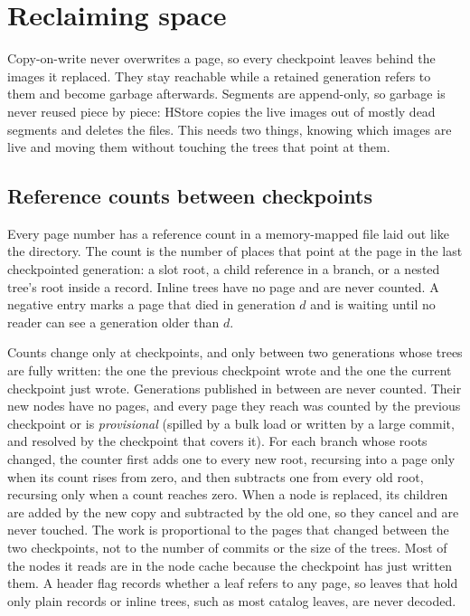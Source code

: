 \section{Reclaiming space}
\label{sec:space}

Copy-on-write never overwrites a page, so every checkpoint leaves behind the images it replaced. They stay reachable while a retained generation refers to them and become garbage afterwards. Segments are append-only, so garbage is never reused piece by piece: HStore copies the live images out of mostly dead segments and deletes the files. This needs two things, knowing which images are live and moving them without touching the trees that point at them.

\subsection{Reference counts between checkpoints}

Every page number has a reference count in a memory-mapped file laid out like the directory. The count is the number of places that point at the page in the last checkpointed generation: a slot root, a child reference in a branch, or a nested tree's root inside a record. Inline trees have no page and are never counted. A negative entry marks a page that died in generation $d$ and is waiting until no reader can see a generation older than $d$.

Counts change only at checkpoints, and only between two generations whose trees are fully written: the one the previous checkpoint wrote and the one the current checkpoint just wrote. Generations published in between are never counted. Their new nodes have no pages, and every page they reach was counted by the previous checkpoint or is \emph{provisional} (spilled by a bulk load or written by a large commit, and resolved by the checkpoint that covers it). For each branch whose roots changed, the counter first adds one to every new root, recursing into a page only when its count rises from zero, and then subtracts one from every old root, recursing only when a count reaches zero. When a node is replaced, its children are added by the new copy and subtracted by the old one, so they cancel and are never touched. The work is proportional to the pages that changed between the two checkpoints, not to the number of commits or the size of the trees. Most of the nodes it reads are in the node cache because the checkpoint has just written them. A header flag records whether a leaf refers to any page, so leaves that hold only plain records or inline trees, such as most catalog leaves, are never decoded.

